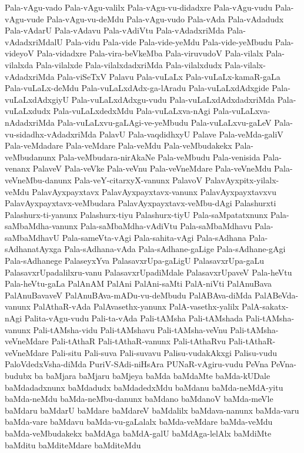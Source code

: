 {Pala-vAgu-vado
Pala-vAgu-valilx
Pala-vAgu-vu-didadxre
Pala-vAgu-vudu
Pala-vAgu-vude
Pala-vAgu-vu-deMdu
Pala-vAgu-vudo
Pala-vAda
Pala-vAdadudx
Pala-vAdarU
Pala-vAdavu
Pala-vAdiVtu
Pala-vAdadxriMda
Pala-vAdadxriMdalU
Pala-vidu
Pala-vide
Pala-vide-yeMdu
Pala-vide-yeMbudu
Pala-videyoV
Pala-vidadxre
Pala-vira-beVkeMba
Pala-viruvudoV
Pala-vilalx
Pala-vilalxda
Pala-vilalxde
Pala-vilalxdadxriMda
Pala-vilalxdudx
Pala-vilalx-vAdadxriMda
Pala-viSeTxV
Palavu
Pala-vuLaLx
Pala-vuLaLx-kamaR-gaLa
Pala-vuLaLx-deMdu
Pala-vuLaLxdAdx-ga-lAradu
Pala-vuLaLxdAdxgide
Pala-vuLaLxdAdxgiyU
Pala-vuLaLxdAdxgu-vudu
Pala-vuLaLxdAdxdadxriMda
Pala-vuLaLxdudx
Pala-vuLaLxdedxMdu
Pala-vuLaLxva-nAgi
Pala-vuLaLxva-nAdadxriMda
Pala-vuLaLxvu-gaLAgi-ve-yeMbudu
Pala-vuLaLxvu-gaLeV
Pala-vu-sidadhx-vAdadxriMda
PalavU
Pala-vaqdidhxyU
Palave
Pala-veMda-galiV
Pala-veMdadare
Pala-veMdare
Pala-veMdu
Pala-veMbudakekx
Pala-veMbudanunx
Pala-veMbudara-nirAkaNe
Pala-veMbudu
Pala-venisida
Pala-venanx
PalaveV
Pala-veVke
Pala-veVnu
Pala-veVneMdare
Pala-veVneMdu
Pala-veVneMbu-danunx
Pala-veY-citarxyX-vanunx
PalavoV
PalavAyxpitx-yilalx-veMdu
PalavAyxpayxtavx
PalavAyxpayxtavx-vanunx
PalavAyxpayxtavxvu
PalavAyxpayxtavx-veMbudara
PalavAyxpayxtavx-veMbu-dAgi
Palashurxti
Palashurx-ti-yanunx
Palashurx-tiyu
Palashurx-tiyU
Pala-saMpatatxnunx
Pala-saMbaMdha-vanunx
Pala-saMbaMdha-vAdiVtu
Pala-saMbaMdhavu
Pala-saMbaMdhavU
Pala-sameVta-vAgi
Pala-sahita-vAgi
Pala-sAdhana
Pala-sAdhanatAyxga
Pala-sAdhana-vAda
Pala-sAdhane-gaLige
Pala-sAdhane-gAgi
Pala-sAdhanege
PalaseyxYva
PalasavxrUpa-gaLigU
PalasavxrUpa-gaLu
PalasavxrUpadalilxru-vanu
PalasavxrUpadiMdale
PalasavxrUpaveV
Pala-heVtu
Pala-heVtu-gaLa
PalAnAM
PalAni
PalAni-saMti
PalA-niVti
PalAnuBava
PalAnuBavaveV
PalAnuBAva-mADu-vu-deMbudu
PalABAva-diMda
PalABeVda-vanunx
PalAthaR-vAda
PalAvasethx-yanunx
PalA-vasethx-yalilx
PalA-sakatx-nAgi
Palita-vAgu-vudu
Pali-ta-vAda
Pali-tAMsha
Pali-tAMshada
Pali-tAMsha-vanunx
Pali-tAMsha-vidu
Pali-tAMshavu
Pali-tAMsha-veVnu
Pali-tAMsha-veVneMdare
Pali-tAthaR
Pali-tAthaR-vanunx
Pali-tAthaRvu
Pali-tAthaR-veVneMdare
Pali-situ
Pali-suva
Pali-suvavu
Palisu-vudakAkxgi
Palisu-vudu
PaloVdedxVsha-diMda
PuriV-SAdi-niHsAra
PUNaR-vAgiru-vudu
PeVna
PeVna-budubx
ba
baMjara
baMjaru
baMjeya
baMda
baMdaMte
baMda-kUDale
baMdadadxnunx
baMdadudx
baMdadedxMdu
baMdanu
baMda-neMdA-yitu
baMda-neMdu
baMda-neMbu-danunx
baMdano
baMdanoV
baMda-meVle
baMdaru
baMdarU
baMdare
baMdareV
baMdalilx
baMdava-nanunx
baMda-varu
baMda-vare
baMdavu
baMda-vu-gaLalalx
baMda-veMdare
baMda-veMdu
baMda-veMbudakekx
baMdAga
baMdA-galU
baMdAga-lelAlx
baMdiMte
baMditu
baMditeMdare
baMditeMdu
}
